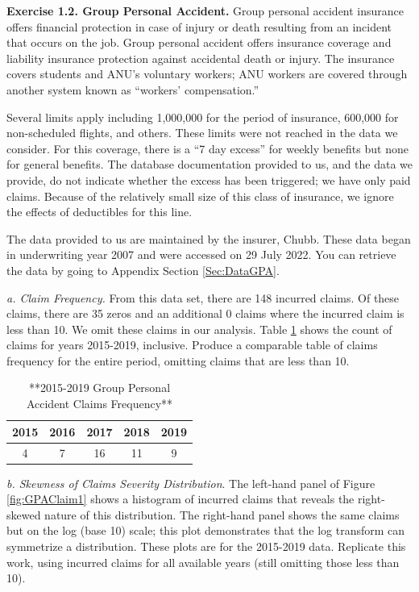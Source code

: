 \documentclass[
]{book}
\begin{document}
\textbf{Exercise 1.2. Group Personal Accident.} Group personal accident insurance offers financial protection in case of injury or death resulting from an incident that occurs on the job. Group personal accident offers insurance coverage and liability insurance protection against accidental death or injury. The insurance covers students and ANU's voluntary workers; ANU workers are covered through another system known as ``workers' compensation.''

Several limits apply including 1,000,000 for the period of insurance, 600,000 for non-scheduled flights, and others. These limits were not reached in the data we consider. For this coverage, there is a ``7 day excess'' for weekly benefits but none for general benefits. The database documentation provided to us, and the data we provide, do not indicate whether the excess has been triggered; we have only paid claims. Because of the relatively small size of this class of insurance, we ignore the effects of deductibles for this line.

The data provided to us are maintained by the insurer, Chubb. These data began in underwriting year 2007 and were accessed on 29 July 2022. You can retrieve the data by going to Appendix Section \ref{Sec:DataGPA}.

\emph{a. Claim Frequency.} From this data set, there are 148 incurred claims. Of these claims, there are 35 zeros and an additional 0 claims where the incurred claim is less than 10. We omit these claims in our analysis. Table \ref{tab:GPAFreq1} shows the count of claims for years 2015-2019, inclusive. Produce a comparable table of claims frequency for the entire period, omitting claims that are less than 10.

\begin{table}

\caption{\label{tab:GPAFreq1}**2015-2019 Group Personal Accident Claims Frequency**}
\centering
\begin{tabular}[t]{c|c|c|c|c}
\hline
2015 & 2016 & 2017 & 2018 & 2019\\
\hline
4 & 7 & 16 & 11 & 9\\
\hline
\end{tabular}
\end{table}

\emph{b. Skewness of Claims Severity Distribution}. The left-hand panel of Figure \ref{fig:GPAClaim1} shows a histogram of incurred claims that reveals the right-skewed nature of this distribution. The right-hand panel shows the same claims but on the log (base 10) scale; this plot demonstrates that the log transform can symmetrize a distribution. These plots are for the 2015-2019 data. Replicate this work, using incurred claims for all available years (still omitting those less than 10).
\end{document}
